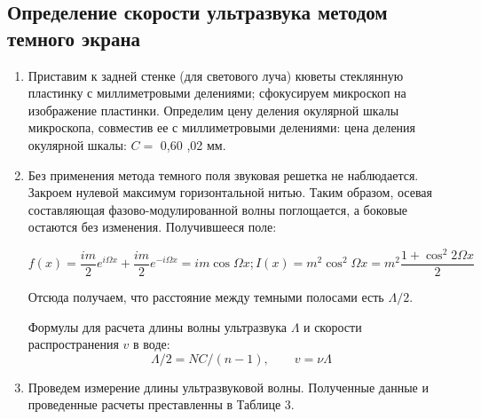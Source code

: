 \documentclass{article}
\begin{document}
\subsection{Определение скорости ультразвука методом темного экрана}
\begin{enumerate}

 \item  Приставим к задней стенке (для светового луча) кюветы стеклянную пластинку с миллиметровыми делениями; сфокусируем микроскоп на изображение пластинки. Определим цену деления окулярной шкалы микроскопа, совместив ее с миллиметровыми делениями: цена деления окулярной шкалы: $ C = $ 0,60 ,02 мм.

  \item  Без применения метода темного поля звуковая решетка не наблюдается. Закроем нулевой максимум горизонтальной нитью. Таким образом, осевая составляющая фазово-модулированной волны поглощается, а боковые остаются без изменения. Получившееся поле: 

\begin{equation}\label{}
f(x) = \dfrac{im}{2} e^{i\Omega x} +  \dfrac{im}{2} e^{-i\Omega x} = im \cos \Omega x; I(x) = m^2 \cos ^2 \Omega x = m^2 \dfrac{1 + \cos ^2 2 \Omega x}{2}
\end{equation}

Отсюда получаем, что расстояние между темными полосами есть $ \Lambda/2 $.

Формулы для расчета длины волны ультразвука $ \Lambda $ и скорости распространения $ v $ в воде:
\begin{equation}\label{}
\Lambda/2  = NC/(n - 1),  \qquad v = \nu\Lambda
\end{equation}

 \item  Проведем измерение длины ультразвуковой волны. Полученные данные и проведенные расчеты преставленны в Таблице 3.


\end{enumerate}
\end{document}

